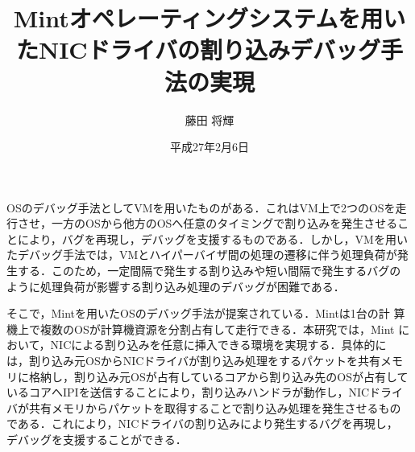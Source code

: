 \documentclass[tanilab-enum]{graduate}
\title{Mintオペレーティングシステムを用いたNICドライバの割り込みデバッグ手法の実現}
\author{藤田 将輝}
\date{平成27年2月6日}
\begin{document}
\maketitle

  OSのデバッグ手法としてVMを用いたものがある．これはVM上で2つのOSを走
行させ，一方のOSから他方のOSへ任意のタイミングで割り込みを発生させるこ
とにより，バグを再現し，デバッグを支援するものである．しかし，VMを用い
たデバッグ手法では，VMとハイパーバイザ間の処理の遷移に伴う処理負荷が発
生する．このため，一定間隔で発生する割り込みや短い間隔で発生するバグの
ように処理負荷が影響する割り込み処理のデバッグが困難である．

  そこで，Mintを用いたOSのデバッグ手法が提案されている．Mintは1台の計
算機上で複数のOSが計算機資源を分割占有して走行できる．本研究では，Mint
において，NICによる割り込みを任意に挿入できる環境を実現する．具体的に
は，割り込み元OSからNICドライバが割り込み処理をするパケットを共有メモ
リに格納し，割り込み元OSが占有しているコアから割り込み先のOSが占有して
いるコアへIPIを送信することにより，割り込みハンドラが動作し，NICドライ
バが共有メモリからパケットを取得することで割り込み処理を発生させるもの
である．これにより，NICドライバの割り込みにより発生するバグを再現し，
デバッグを支援することができる．


\tableandlists%

\end{document}
